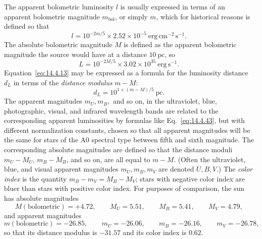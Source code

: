 The apparent bolometric luminosity \(l\) is usually expressed in terms of an
apparent bolometric magnitude \(m_{\mathrm{bol}}\), or simply \(m\), which
for historical reasons is defined so that
\begin{equation}
  l
  =
  10^{-2m/5}
  \times
  2.52\times10^{-5}\ 
  \mathrm{erg\,cm^{-2}\,s^{-1}}.
  \tag{14.4.43}\label{eq:14.4.43}
\end{equation}
The absolute bolometric magnitude \(M\) is defined as the apparent
bolometric magnitude the source would have at a distance \(10\ \mathrm{pc}\),
so
\begin{equation}
  L
  =
  10^{-2M/5}
  \times
  3.02\times10^{35}\ 
  \mathrm{erg\,s^{-1}}.
  \tag{14.4.44}\label{eq:14.4.44}
\end{equation}
Equation~\eqref{eq:14.4.13} may be expressed as a formula for the luminosity
distance \(d_L\) in terms of the \emph{distance modulus} \(m-M\):
\begin{equation}
  d_L=10^{1+(m-M)/5}\ \mathrm{pc}.
  \tag{14.4.45}\label{eq:14.4.45}
\end{equation}
The apparent magnitudes \(m_U,m_B,\) and so on, in the ultraviolet, blue,
photographic, visual, and infrared wavelength bands are related to the
corresponding apparent luminosities by formulas like
Eq.~\eqref{eq:14.4.43}, but with different normalization constants, chosen
so that all apparent magnitudes will be the same for stars of the A0 spectral
type between fifth and sixth magnitude. The corresponding absolute
magnitudes are defined so that the distance moduli \(m_U-M_U\),
\(m_B-M_B\), and so on, are all equal to \(m-M\). (Often the ultraviolet,
blue, and visual apparent magnitudes \(m_U,m_B,m_V\) are denoted \(U,B,V\).)
The \emph{color index} is the quantity
\(m_B-m_V=M_B-M_V\); stars with negative color index are bluer than stars
with positive color index. For purposes of comparison, the sun has absolute
magnitudes
\[
  M(\text{bolometric})=+4.72,
  \qquad
  M_U=5.51,
  \qquad
  M_B=5.41,
  \qquad
  M_V=4.79,
\]
and apparent magnitudes
\[
  m(\text{bolometric})=-26.85,
  \qquad
  m_U=-26.06,
  \qquad
  m_B=-26.16,
  \qquad
  m_V=-26.78,
\]
so that its distance modulus is \(-31.57\) and its color index is \(0.62\).
